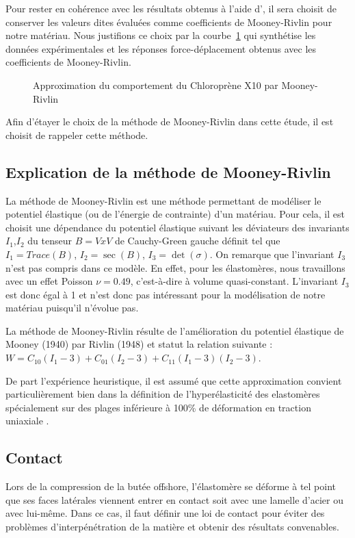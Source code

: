 ﻿\documentclass{article}
\newcommand{\abaqus}{\bsc{Abaqus}\xspace}
\begin{document}
Pour rester en cohérence avec les résultats obtenus à l'aide d'\abaqus, il sera choisit de conserver les valeurs dites évaluées comme coefficients de Mooney-Rivlin pour notre matériau. Nous justifions ce choix par la courbe~\ref{fig:plot_donnees_essais} qui synthétise les données expérimentales et les réponses force-déplacement obtenus avec les coefficients de Mooney-Rivlin.

\begin{figure}
\caption{Approximation du comportement du Chloroprène X10 par Mooney-Rivlin}
\label{fig:plot_donnees_essais}
\end{figure}

Afin d'étayer le choix de la méthode de Mooney-Rivlin dans cette étude, il est choisit de rappeler cette méthode.

\subsection{Explication de la méthode de Mooney-Rivlin}
La méthode de Mooney-Rivlin est une méthode permettant de modéliser le potentiel élastique (ou de l'énergie de contrainte) d'un matériau. Pour cela, il est choisit une dépendance du potentiel élastique suivant les déviateurs des invariants $I_1$,$I_2$ du tenseur $B = V x V$ de Cauchy-Green gauche définit tel que $I_1 = Trace(B)$, $I_2 = \sec(B)$, $I_3=\det(\sigma)$.
On remarque que l'invariant $I_3$ n'est pas compris dans ce modèle. En effet, pour les élastomères, nous travaillons avec un effet Poisson $\nu = 0.49$, c'est-à-dire à volume quasi-constant. L'invariant $I_3$ est donc égal à 1 et n'est donc pas intéressant pour la modélisation de notre matériau puisqu'il n'évolue pas.

La méthode de Mooney-Rivlin résulte de l'amélioration du potentiel élastique de Mooney (1940) par Rivlin (1948) et statut la relation suivante \cite{wiki_MR}: $W = C_10(I_1-3) + C_01(I_2-3) + C_11(I_1-3)(I_2-3)$.

De part l'expérience heuristique, il est assumé que cette approximation convient particulièrement bien dans la définition de l'hyperélasticité des elastomères spécialement sur des plages inférieure à 100\% de déformation en traction uniaxiale \cite{msc}.

\subsection{Contact}
Lors de la compression de la butée offshore, l'élastomère se déforme à tel point que ses faces latérales viennent entrer en contact soit avec une lamelle d'acier ou avec lui-même. Dans ce cas, il faut définir une loi de contact pour éviter des problèmes d'interpénétration de la matière et obtenir des résultats convenables.
\end{document}
